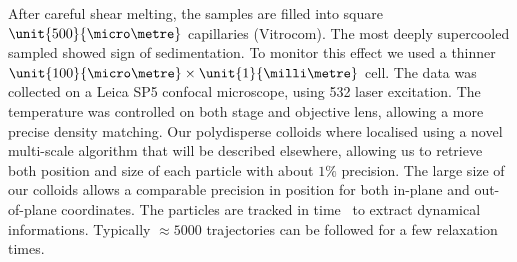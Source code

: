 \documentclass[11pt,a4paper]{article}
\begin{document}
After careful shear melting, the samples are filled into square $\unit{500}{\micro\metre}$ capillaries (Vitrocom). The most deeply supercooled sampled showed sign of sedimentation. To monitor this effect we used a thinner $\unit{100}{\micro\metre}\times\unit{1}{\milli\metre}$ cell. The data was collected on a Leica SP5 confocal microscope, using \unit{532}{\nano\meter} laser excitation. The temperature was controlled on both stage and objective lens, allowing a more precise density matching. Our polydisperse colloids where localised using a novel multi-scale algorithm that will be described elsewhere, allowing us to retrieve both position and size of each particle with about $1\%$ precision. The large size of our colloids allows a comparable precision in position for both in-plane and out-of-plane coordinates. The particles are tracked in time~\citep{Crocker1996} to extract dynamical informations. Typically $\approx 5000$ trajectories can be followed for a few relaxation times.
\end{document}
